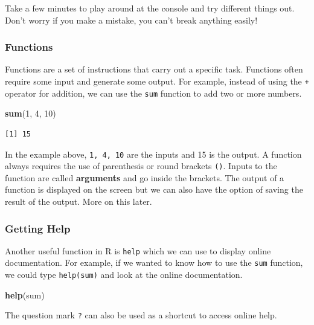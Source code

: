 \documentclass[]{article}
\newenvironment{Shaded}{\begin{snugshade}}{\end{snugshade}}
\newcommand{\KeywordTok}[1]{\textcolor[rgb]{0.13,0.29,0.53}{\textbf{#1}}}
\newcommand{\DecValTok}[1]{\textcolor[rgb]{0.00,0.00,0.81}{#1}}
\newcommand{\NormalTok}[1]{#1}
\theoremstyle{definition}
\theoremstyle{definition}
\theoremstyle{definition}
\theoremstyle{remark}
\begin{document}
Take a few minutes to play around at the console and try different
things out. Don't worry if you make a mistake, you can't break anything
easily!

\subsubsection{Functions}\label{functions}

Functions are a set of instructions that carry out a specific task.
Functions often require some input and generate some output. For
example, instead of using the \texttt{+} operator for addition, we can
use the \texttt{sum} function to add two or more numbers.

\begin{Shaded}
\begin{Highlighting}[]
\KeywordTok{sum}\NormalTok{(}\DecValTok{1}\NormalTok{, }\DecValTok{4}\NormalTok{, }\DecValTok{10}\NormalTok{)}
\end{Highlighting}
\end{Shaded}

\begin{verbatim}
[1] 15
\end{verbatim}

In the example above, \texttt{1,\ 4,\ 10} are the inputs and 15 is the
output. A function always requires the use of parenthesis or round
brackets \texttt{()}. Inputs to the function are called
\textbf{arguments} and go inside the brackets. The output of a function
is displayed on the screen but we can also have the option of saving the
result of the output. More on this later.

\subsubsection{Getting Help}\label{getting-help}

Another useful function in R is \texttt{help} which we can use to
display online documentation. For example, if we wanted to know how to
use the \texttt{sum} function, we could type \texttt{help(sum)} and look
at the online documentation.

\begin{Shaded}
\begin{Highlighting}[]
\KeywordTok{help}\NormalTok{(sum)}
\end{Highlighting}
\end{Shaded}

The question mark \texttt{?} can also be used as a shortcut to access
online help.
\end{document}
